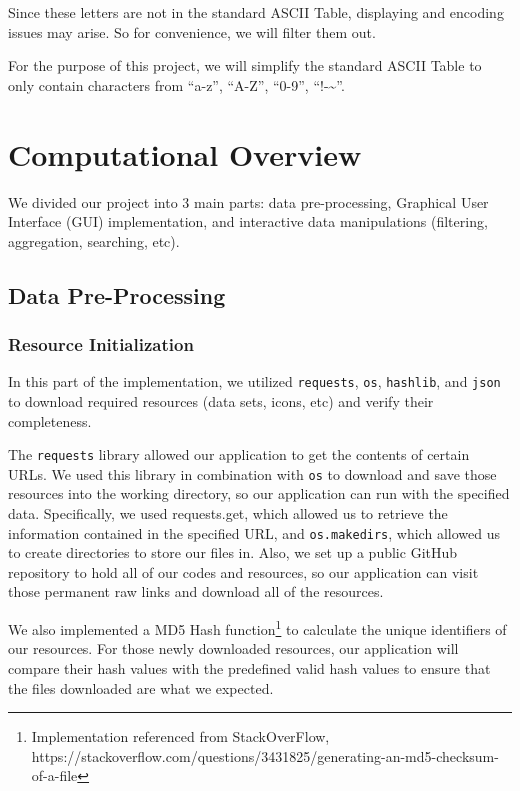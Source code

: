 \documentclass[fontsize=11pt]{article}
\begin{document}
    Since these letters are not in the standard ASCII Table, displaying and encoding issues may arise. So for convenience, we will filter them out.

    For the purpose of this project, we will simplify the standard ASCII Table to only contain characters from ``a-z'', ``A-Z'', ``0-9'', ``!-\~{}''.

    \newpage

    \section{Computational Overview}

    We divided our project into 3 main parts: data pre-processing, Graphical User Interface (GUI) implementation, and interactive data manipulations (filtering, aggregation, searching, etc).

    \subsection{Data Pre-Processing}

    \subsubsection{Resource Initialization}

    In this part of the implementation, we utilized \verb|requests|, \verb|os|, \verb|hashlib|, and \verb|json| to download required resources (data sets, icons, etc) and verify their completeness.

    The \verb|requests| library allowed our application to get the contents of certain URLs. We used this library in combination with \verb|os| to download and save those resources into the working directory, so our application can run with the specified data. Specifically, we used requests.get, which allowed us to retrieve the information contained in the specified URL, and \verb|os.makedirs|, which allowed us to create directories to store our files in. Also, we set up a public GitHub repository to hold all of our codes and resources, so our application can visit those permanent raw links and download all of the resources.

    We also implemented a MD5 Hash function\footnote{Implementation referenced from StackOverFlow, https://stackoverflow.com/questions/3431825/generating-an-md5-checksum-of-a-file} to calculate the unique identifiers of our resources. For those newly downloaded resources, our application will compare their hash values with the predefined valid hash values to ensure that the files downloaded are what we expected.
\end{document}
